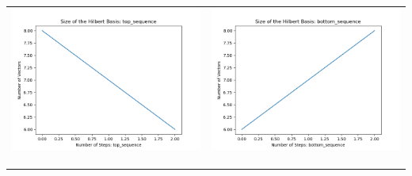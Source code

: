 \documentclass[10pt]{article}
\begin{document}
\begin{tabular}{c|c}
\begin{minipage}{.4\textwidth}
\includegraphics[width=\textwidth]{"DATA/5d/5 generators 1 bound F/top_sequence SIZE"}
\end{minipage} &
\begin{minipage}{.4\textwidth}
\includegraphics[width=\textwidth]{"DATA/5d/5 generators 1 bound F bottomup/bottom_sequence SIZE"}
\end{minipage} \\ \\
\hline \\\begin{minipage}{.4\textwidth}

\end{minipage}
\end{tabular}
\end{document}

